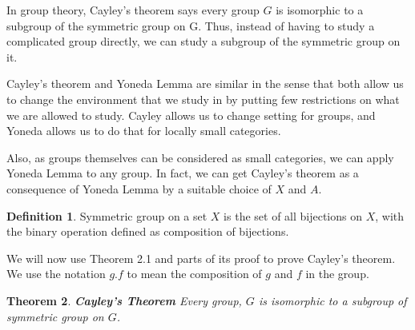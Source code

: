 \documentclass[a4paper]{article}
\newtheorem{theorem}{Theorem}[section]
\theoremstyle{definition}
\newtheorem{definition}[theorem]{Definition}
\begin{document}
		In group theory, Cayley's theorem says every group $G$ is isomorphic to a subgroup of the symmetric
		group on G. Thus, instead of having to study a complicated group directly, we can study a subgroup of
		the symmetric group on it.

		Cayley's theorem and Yoneda Lemma are similar in the sense that both allow us to change the environment
		that we study in by putting few restrictions on what we are allowed to study. Cayley allows us to
		change setting for groups, and Yoneda allows us to do that for locally small categories.

		Also, as groups themselves can be considered as small categories, we can apply Yoneda Lemma to any
		group. In fact, we can get Cayley's theorem as a consequence of Yoneda Lemma by a suitable
		choice of $X$ and $A$.
		\begin{definition} %
			Symmetric group on a set $X$ is the set of all bijections on $X$, with the binary operation
			defined as composition of bijections.
		\end{definition}
		We will now use Theorem 2.1 and parts of its proof to prove Cayley's theorem.
		We use the notation $g.f$ to mean the composition of $g$ and $f$ in the group.
		\begin{theorem}{\textbf{Cayley's Theorem}} %
			Every group, $G$ is isomorphic to a subgroup of symmetric group on $G$.
		\end{theorem}
\end{document}
